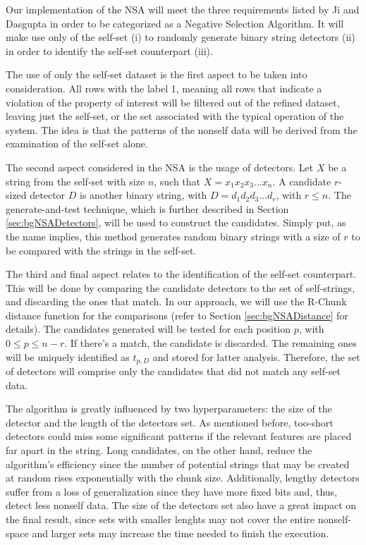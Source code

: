 Our implementation of the NSA will meet the three requirements listed by Ji and Dasgupta \cite{RevisitingNSA2007} in order to be categorized as a Negative Selection Algorithm. It will make use only of the self-set (i) to randomly generate binary string detectors (ii) in order to identify the self-set counterpart (iii).

The use of only the self-set dataset is the first aspect to be taken into consideration. All rows with the label 1, meaning all rows that indicate a violation of the property of interest will be filtered out of the refined dataset, leaving just the self-set, or the set associated with the typical operation of the system. The idea is that the patterns of the nonself data will be derived from the examination of the self-set alone.

The second aspect considered in the NSA is the usage of detectors. Let \(X\) be a string from the self-set with size \(n\), such that \(X = x_1x_2x_3...x_n\). A candidate \(r\)-sized detector \(D\) is another binary string, with \(D = d_1d_2d_3...d_r\), with \(r \leq n\). The generate-and-test technique, which is further described in Section \ref{sec:bgNSADetectors}, will be used to construct the candidates. Simply put, as the name implies, this method generates random binary strings with a size of \(r\) to be compared with the strings in the self-set. 

The third and final aspect relates to the identification of the self-set counterpart. This will be done by comparing the candidate detectors to the set of self-strings, and discarding the ones that match. In our approach, we will use the R-Chunk distance function for the comparisons (refer to Section \ref{sec:bgNSADistance} for details). The candidates generated will be tested for each position \(p\), with \(0 \leq p \leq n-r\). If there's a match, the candidate is discarded. The remaining ones will be uniquely identified as \(t_{p, D}\) and stored for latter analysis. Therefore, the set of detectors will comprise only the candidates that did not match any self-set data.

The algorithm is greatly influenced by two hyperparameters: the size of the detector and the length of the detectors set. As mentioned before, too-short detectors could miss some significant patterns if the relevant features are placed far apart in the string. Long candidates, on the other hand, reduce the algorithm's efficiency since the number of potential strings that may be created at random rises exponentially with the chunk size. Additionally, lengthy detectors suffer from a loss of generalization since they have more fixed bits and, thus, detect less nonself data. The size of the detectors set also have a great impact on the final result, since sets with smaller lenghts may not cover the entire nonself-space and larger sets may increase the time needed to finish the execution. 

